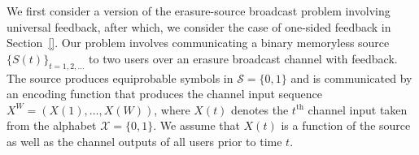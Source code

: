 We first consider a version of the erasure-source broadcast problem involving universal feedback, after which, we consider the case of one-sided feedback in Section~\ref{}. Our problem involves communicating a binary memoryless source $\{S(t)\}_{t=1,2, \ldots}$ to two users over an erasure broadcast channel with feedback.  %
%
%
The source produces equiprobable symbols in $\mathcal{S}=\{0,1\}$ and is communicated by an encoding function that produces the channel input sequence $X^{W} = (X(1),  \dots , X(W))$, where $X(t)$ denotes the $t^{\mathrm{th}}$ channel input taken from the alphabet $\mathcal{X} = \{0, 1\}$.  We assume that 
$X(t)$ is a function of the source as well as the channel outputs of all users prior to time $t$.  


